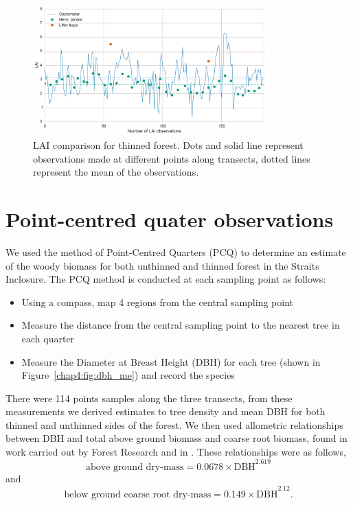 \begin{figure}[ht]
    \centering
    \includegraphics[width=0.8\textwidth]{chapter/chapter4/thinned14.pdf}
    \caption{LAI comparison for thinned forest. Dots and solid line represent observations made at different points along transects, dotted lines represent the mean of the observations.} \label{chap4:fig:lai_comp14}
\end{figure}

\section{Point-centred quater observations}

We used the method of Point-Centred Quarters (PCQ) \citep{dahdouh2006empirical} to determine an estimate of the woody biomass for both unthinned and thinned forest in the Straits Inclosure. The PCQ method is conducted at each sampling point as follows:
\begin{itemize}
\item Using a compass, map 4 regions from the central sampling point
\item Measure the distance from the central sampling point to the nearest tree in each quarter
\item Measure the Diameter at Breast Height (DBH) for each tree (shown in Figure~\ref{chap4:fig:dbh_me}) and record the species 
\end{itemize}
There were 114 points samples along the three transects, from these measurements we derived estimates to tree density and mean DBH for both thinned and unthinned sides of the forest. We then used allometric relationships between DBH and total above ground biomass and coarse root biomass, found in work carried out by Forest Research and in \citet{mckay2003woodfuel}. These relationships were as follows,
\begin{equation}
\text{above ground dry-mass} = 0.0678\times \overline{\text{DBH}}^{2.619}
\end{equation}
and
\begin{equation}
\text{below ground coarse root dry-mass} = 0.149\times \overline{\text{DBH}}^{2.12}.
\end{equation}

